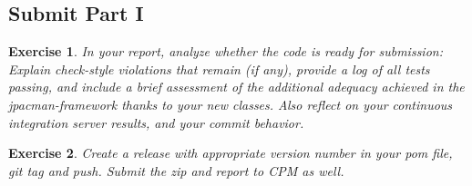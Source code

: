 \documentclass[a4paper]{article}
\newtheorem{thm}{Exercise}
\begin{document}
  
  \subsection{Submit Part I}
    \begin{thm}
      In your report, analyze whether the code is ready for submission: Explain check-style violations that remain (if any), provide a log of all tests passing, and include a brief assessment of the additional adequacy achieved in the jpacman-framework thanks to your new classes. Also reflect on your continuous integration server results, and your commit behavior.
    \end{thm}
    
    
    \begin{thm}
      Create a release with appropriate version number in your pom file, git tag and push. Submit the zip and report to CPM as well.
    \end{thm}
    
\end{document}
